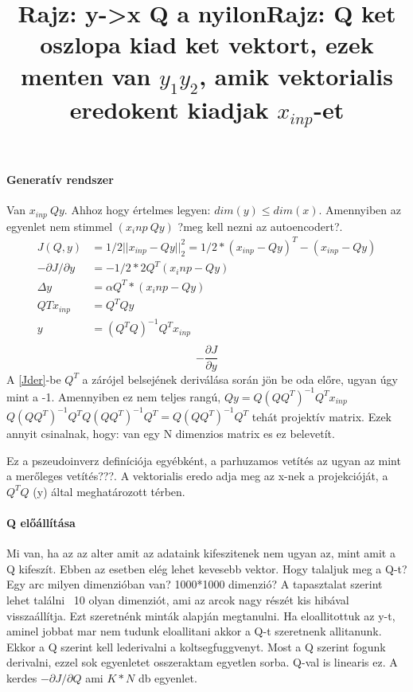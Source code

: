 \documentclass[10pt,a4paper]{report}
\begin{document}
\paragraph{Generatív rendszer}
\begin{figure}[h]
\title{Rajz: y->x Q a nyilon}
\end{figure}
Van $x_{inp} ~ Qy$. Ahhoz hogy értelmes legyen: $dim(y)\leq dim(x)$. Amennyiben az egyenlet nem stimmel $(x_inp ~ Qy)$ ?meg kell nezni az autoencodert?. 
\begin{align}
J(Q,y) &= 1/2||x_{inp}-Qy||_2^2=1/2*(x_{inp}-Qy)^T -(x_{inp} - Qy)\\
\label{Jder}-\partial J/\partial y &= -1/2 * 2 Q^T (x_inp-Qy)\\
\Delta y &= \alpha Q^T*(x_inp - Qy)\\
QTx_{inp} &= Q^TQy \\
y &=(Q^TQ)^{-1}Q^Tx_{inp}\\
\end{align}
\begin{equation}
-\frac{\partial J}{\partial y}
\end{equation}
A \ref{Jder}-be $Q^T$ a zárójel belsejének  deriválása során jön be oda előre, ugyan úgy mint a -1. Amennyiben ez nem teljes rangú, $Qy= Q(QQ^T)^{-1} Q^Tx_{inp}$ $Q(QQ^T)^{-1} Q^TQ(QQ^T)^{-1} Q^T = Q(QQ^T)^{-1} Q^T$ tehát projektív matrix. Ezek annyit csinalnak, hogy: van egy N dimenzios matrix es ez belevetít.
\begin{figure}[h]
\title{Rajz: Q ket oszlopa kiad ket vektort, ezek menten van $y_1 y_2$, amik vektorialis eredokent kiadjak $x_{inp}$-et}
\end{figure}
Ez a pszeudoinverz definíciója egyébként, a parhuzamos vetítés az ugyan az mint a merőleges vetítés???.%
A vektorialis eredo adja meg az x-nek a projekcióját, a $Q^TQ$ (y) által meghatározott térben. %
\paragraph*{Q előállítása}
Mi van, ha az az alter amit az adataink kifeszitenek  nem ugyan az, mint amit a Q kifeszít. Ebben az esetben elég lehet kevesebb vektor. Hogy talaljuk meg a Q-t? Egy arc milyen dimenzióban van? 1000*1000 dimenzió? A tapasztalat szerint lehet találni ~10 olyan dimenziót, ami az arcok nagy részét kis hibával visszaállítja. Ezt szeretnénk minták alapján megtanulni. Ha eloallitottuk az y-t, aminel jobbat mar nem tudunk eloallitani akkor a Q-t szeretnenk allitanunk. Ekkor a Q szerint kell lederivalni a koltsegfuggvenyt. Most a Q szerint fogunk derivalni, ezzel sok egyenletet osszeraktam egyetlen sorba. Q-val is linearis ez. A kerdes $ -\partial J/\partial Q$ ami $K*N$ db egyenlet.
\end{document}
